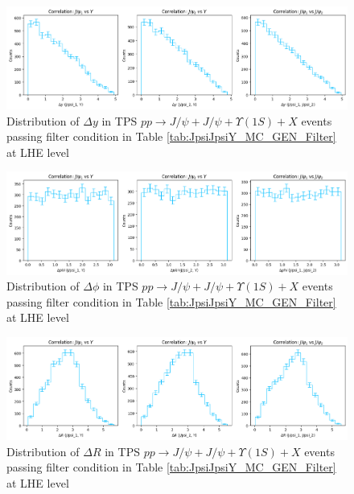 \documentclass[10pt,twocolumn]{article}
\begin{document}
\begin{figure}
    \centering
    \includegraphics[width=1.0\linewidth]{images/LHE_LEVEL_TPS_DeltaY_filtered.png}
    \caption{Distribution of $\Delta y$ in TPS $pp\to J/\psi+J/\psi+\Upsilon(1S)+X$ events passing filter condition in Table \ref{tab:JpsiJpsiY_MC_GEN_Filter} at LHE level}
    \label{fig:TPS_JJY1S_filtered_DeltaY_LHE}
\end{figure}

\begin{figure}
    \centering
    \includegraphics[width=1.0\linewidth]{images/LHE_LEVEL_TPS_DeltaPhi_filtered.png}
    \caption{Distribution of $\Delta \phi$ in TPS $pp\to J/\psi+J/\psi+\Upsilon(1S)+X$ events passing filter condition in Table \ref{tab:JpsiJpsiY_MC_GEN_Filter} at LHE level}
    \label{fig:TPS_JJY1S_filtered_DeltaPhi_LHE}
\end{figure}

\begin{figure}
    \centering
    \includegraphics[width=1.0\linewidth]{images/LHE_LEVEL_TPS_DeltaR_filtered.png}
    \caption{Distribution of $\Delta R$ in TPS $pp\to J/\psi+J/\psi+\Upsilon(1S)+X$ events passing filter condition in Table \ref{tab:JpsiJpsiY_MC_GEN_Filter} at LHE level}
    \label{fig:TPS_JJY1S_filtered_DeltaR_LHE}
\end{figure}
\end{document}
